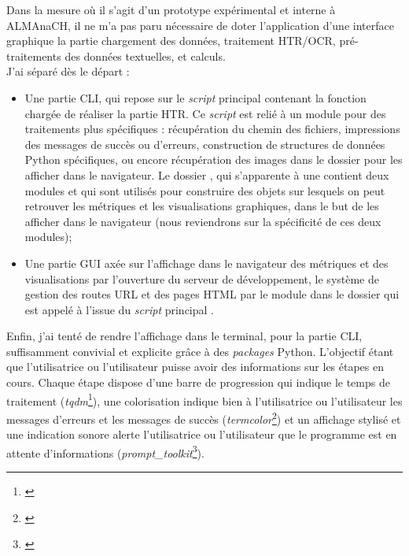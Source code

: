 Dans la mesure où il s'agit d'un prototype expérimental et interne à ALMAnaCH, il ne m'a pas paru nécessaire de doter l'application d'une interface graphique la partie chargement des données, traitement HTR/OCR, pré-traitements des données textuelles, et calculs. \\

J'ai séparé dès le départ :

\begin{itemize}
    \item Une partie CLI, qui repose sur le \textit{script} principal  contenant la fonction chargée de réaliser la partie HTR. Ce \textit{script} est relié à un module pour des traitements plus spécifiques  : récupération du chemin des fichiers, impressions des messages de succès ou d'erreurs, construction de structures de données Python spécifiques, ou encore récupération des images dans le dossier  pour les afficher dans le navigateur. Le dossier , qui s'apparente à une  contient  deux modules  et  qui sont utilisés pour construire des objets sur lesquels on peut retrouver les métriques et les visualisations graphiques, dans le but de les afficher dans le navigateur (nous reviendrons sur la spécificité de ces deux modules);\\
     \item Une partie GUI axée sur l'affichage dans le navigateur des métriques et des visualisations par l'ouverture du serveur de développement, le système de gestion des routes URL et des pages HTML par le module  dans le dossier  qui est appelé à l'issue du \textit{script} principal . 
\end{itemize}
\bigskip
Enfin, j'ai tenté de rendre l'affichage dans le terminal, pour la partie CLI, suffisamment convivial et explicite grâce à des \textit{packages} Python. L'objectif étant que l'utilisatrice ou l'utilisateur puisse avoir des informations sur les étapes en cours. Chaque étape dispose d'une barre de progression qui indique le temps de traitement (\textit{tqdm}\footnote{\cite{noauthor_tqdm_nodate}}), une colorisation indique bien à l'utilisatrice ou l'utilisateur les messages d'erreurs et les messages de succès (\textit{termcolor}\footnote{\cite{noauthor_termcolor_nodate}}) et un affichage stylisé et une indication sonore alerte l'utilisatrice ou l'utilisateur que le programme est en attente d'informations (\textit{prompt\_toolkit}\footnote{\cite{noauthor_prompt-toolkit_nodate}}). 

